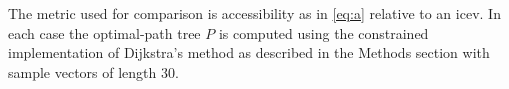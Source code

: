 \documentclass[11pt]{article}
\begin{document}
\begin{multicols}{2}
The metric used for comparison is accessibility as in \eqref{eq:a} relative to an \gls{icev}. In each case the optimal-path tree $P$ is computed using the constrained implementation of Dijkstra's method as described in the Methods section with sample vectors of length 30.

\newpage

\printbibliography

\end{multicols}
\end{document}
